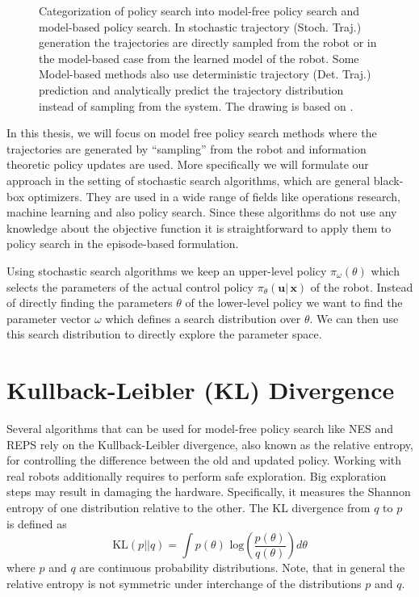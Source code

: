 $~$
\begin{figure}[ht!]
  \centering
  
    \caption{\small
      Categorization of policy search into model-free policy
      search and model-based policy search.
      In stochastic trajectory (Stoch. Traj.) generation 
      the trajectories are directly sampled from the robot or
      in the model-based case from the learned model of the robot.
      Some Model-based methods also use deterministic trajectory
      (Det. Traj.) prediction 
      and analytically predict the trajectory distribution
      instead of sampling from the system. 
      The drawing is based on
      \citet{deisenroth2013survey}.
    }
    \label{fig:policy}
\end{figure}



In this thesis, we will focus on model free policy search methods
where the trajectories are generated by ``sampling'' from
the robot and information theoretic policy updates are used.
More specifically we will formulate our approach
in the setting of stochastic
search algorithms, which are general black-box optimizers.
They are used in a wide range of fields like operations research,
machine learning and also policy search.
Since these algorithms do not use any knowledge about the
objective function it is straightforward to
apply them to policy search in the episode-based formulation.

Using stochastic search algorithms we keep an upper-level policy
$\pi_{\omega}(\theta)$ which selects the parameters of the
actual control policy $\pi_{\theta}(\mathbf{u} |\, \mathbf{x})$ of the robot.
Instead of directly finding the parameters $\theta$ of the
lower-level policy we want to find the parameter vector $\omega$ which
defines a search distribution over $\theta$. We can then use this
search distribution to directly explore the parameter space.


\section{Kullback-Leibler (KL) Divergence}
\label{sec:kl}
Several algorithms that can be used for model-free policy search like
NES \citep{wierstra2014natural} and
REPS \citep{peters2010relative} 
rely on the Kullback-Leibler divergence, also
known as the relative entropy, for controlling
the difference between the old and updated policy.
Working with real robots additionally requires to perform safe exploration.
Big exploration steps may result in damaging the hardware.
Specifically, it measures the Shannon entropy of one distribution
relative to the other.
The KL divergence from $q$ to $p$ is defined as
$$ \text{KL}(p || q)
= \int p(\theta) \text{ log} \left(\frac{p(\theta)}{q(\theta)}\right)
d \theta $$
where $p$ and $q$ are continuous probability distributions.
Note, that in general the relative entropy is not symmetric under interchange
of the distributions $p$ and $q$.

